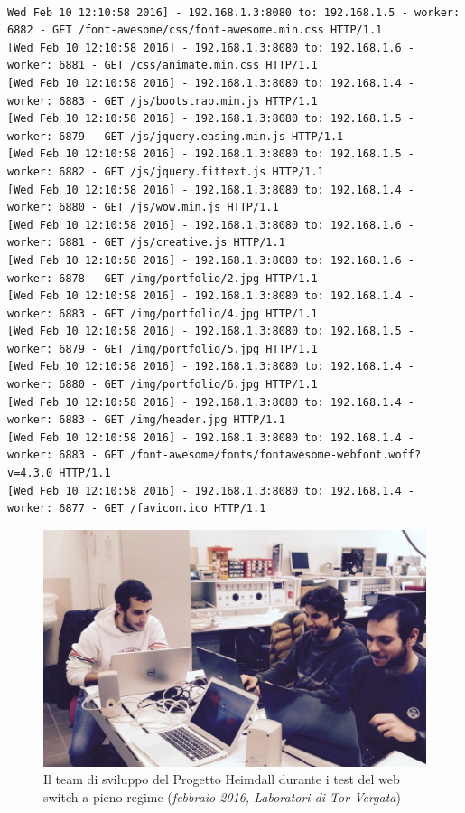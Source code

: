 \documentclass[italian]{tktltiki2}
\begin{document}
\begin{lstlisting}[basicstyle=\fontsize{4}{7}\selectfont\ttfamily]

Wed Feb 10 12:10:58 2016] - 192.168.1.3:8080 to: 192.168.1.5 - worker: 6882 - GET /font-awesome/css/font-awesome.min.css HTTP/1.1
[Wed Feb 10 12:10:58 2016] - 192.168.1.3:8080 to: 192.168.1.6 - worker: 6881 - GET /css/animate.min.css HTTP/1.1
[Wed Feb 10 12:10:58 2016] - 192.168.1.3:8080 to: 192.168.1.4 - worker: 6883 - GET /js/bootstrap.min.js HTTP/1.1
[Wed Feb 10 12:10:58 2016] - 192.168.1.3:8080 to: 192.168.1.5 - worker: 6879 - GET /js/jquery.easing.min.js HTTP/1.1
[Wed Feb 10 12:10:58 2016] - 192.168.1.3:8080 to: 192.168.1.5 - worker: 6882 - GET /js/jquery.fittext.js HTTP/1.1
[Wed Feb 10 12:10:58 2016] - 192.168.1.3:8080 to: 192.168.1.4 - worker: 6880 - GET /js/wow.min.js HTTP/1.1
[Wed Feb 10 12:10:58 2016] - 192.168.1.3:8080 to: 192.168.1.6 - worker: 6881 - GET /js/creative.js HTTP/1.1
[Wed Feb 10 12:10:58 2016] - 192.168.1.3:8080 to: 192.168.1.6 - worker: 6878 - GET /img/portfolio/2.jpg HTTP/1.1
[Wed Feb 10 12:10:58 2016] - 192.168.1.3:8080 to: 192.168.1.4 - worker: 6883 - GET /img/portfolio/4.jpg HTTP/1.1
[Wed Feb 10 12:10:58 2016] - 192.168.1.3:8080 to: 192.168.1.5 - worker: 6879 - GET /img/portfolio/5.jpg HTTP/1.1
[Wed Feb 10 12:10:58 2016] - 192.168.1.3:8080 to: 192.168.1.4 - worker: 6880 - GET /img/portfolio/6.jpg HTTP/1.1
[Wed Feb 10 12:10:58 2016] - 192.168.1.3:8080 to: 192.168.1.4 - worker: 6883 - GET /img/header.jpg HTTP/1.1
[Wed Feb 10 12:10:58 2016] - 192.168.1.3:8080 to: 192.168.1.4 - worker: 6883 - GET /font-awesome/fonts/fontawesome-webfont.woff?v=4.3.0 HTTP/1.1
[Wed Feb 10 12:10:58 2016] - 192.168.1.3:8080 to: 192.168.1.4 - worker: 6877 - GET /favicon.ico HTTP/1.1

\end{lstlisting}

\newpage
\begin{figure}[c]
\centering
\includegraphics[width=\textwidth]{images/team}
\caption{Il team di sviluppo del Progetto Heimdall durante i test del web switch a pieno regime (\emph{febbraio 2016, Laboratori di Tor Vergata})}
\end{figure}
\end{document}
